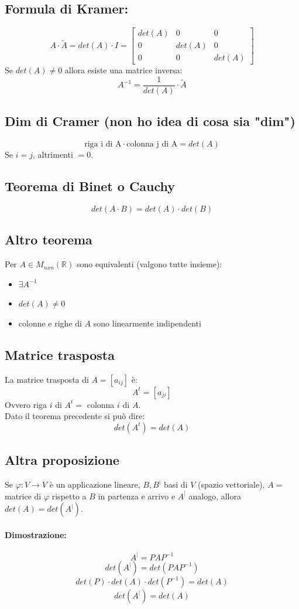 \documentclass[12pt,a4paper]{article}
\begin{document}
\subsection{Formula di Kramer:}
\[
A \cdot \tilde{A} = det(A) \cdot I = \begin{bmatrix}
  det(A) & 0 & 0\\
  0 & det(A) & 0\\
  0 & 0 & det(A)
\end{bmatrix}
\]
Se $det(A) \ne 0$ allora esiste una matrice inversa:
\[
A^{-1} = \frac{1}{det(A)} \cdot \tilde{A}
\]
\subsection{Dim di Cramer (non ho idea di cosa sia "dim")}
\[
\text{riga i di A} \cdot \text{colonna j di A} = det(A)
\]
Se $i = j$, altrimenti $= 0$.
\subsection{Teorema di Binet o Cauchy}
\[
det(A \cdot B) = det(A) \cdot det(B)
\]
\subsection{Altro teorema}
Per $A \in M_{nxn}(\mathbb{R})$ sono equivalenti (valgono tutte insieme):
\begin{itemize}
  \item $\exists A^{-1}$
  \item $det(A) \ne 0$
  \item colonne e righe di $A$ sono linearmente indipendenti
\end{itemize}
\subsection{Matrice trasposta}
La matrice trasposta di $A = [a_{ij}]$ è:
\[
A^t = [a_{ji}]
\]
Ovvero riga $i$ di $A^t =$ colonna $i$ di $A$.\\
Dato il teorema precedente si può dire:
\[
det(A^t) = det(A)
\]
\subsection{Altra proposizione}
Se $\varphi: V \to V$ è un applicazione lineare, $B,B^|$ basi di $V$ (spazio vettoriale), $A =$ matrice di $\varphi$ rispetto a $B$ in partenza e arrivo e $A^|$ analogo, allora $det(A) = det(A^|)$.
\paragraph{Dimostrazione:}
\[
A^| = PAP^{-1}
\]
\[
det(A^|) = det(PAP^{-1})
\]
\[
det(P) \cdot det(A) \cdot det(P^{-1}) = det(A)
\]
\[
det(A^|) = det(A)
\]
\end{document}
